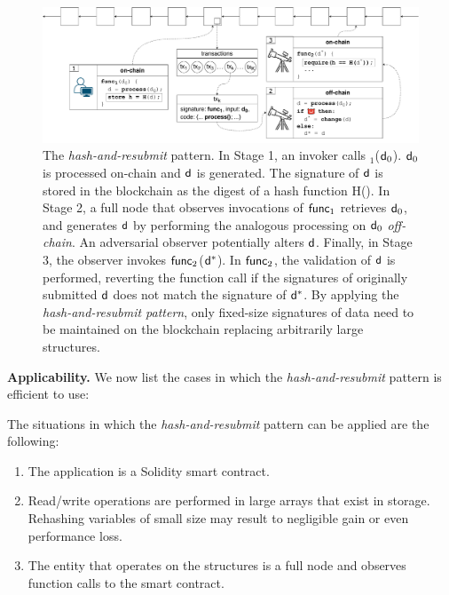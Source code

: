 \begin{figure}[h]
    \begin{center} \includegraphics[width=1\textwidth]{figures/har-pattern.pdf}
    \end{center}

    \caption{The \emph{hash-and-resubmit} pattern. In Stage 1, an invoker calls
        \proc$_1$($\mathsf{d}_0$). $\mathsf{d}_0$ is processed on-chain and $\mathsf{d}$ is
        generated. The signature of $\mathsf{d}$ is stored in the blockchain as the
        digest of a hash function \textsf{H}(). In Stage 2, a full node that
        observes invocations of $\textsf{func}_1$ retrieves $\mathsf{d}_0$, and generates
        $\mathsf{d}$ by performing the analogous processing on $\mathsf{d}_0$
        \emph{off-chain}. An adversarial observer potentially alters $\mathsf{d}$.
        Finally, in Stage 3, the observer invokes $\textsf{func}_2$($\mathsf{d}^*$). In
        $\textsf{func}_2$, the validation of $\mathsf{d}$ is performed, reverting the
        function call if the signatures of originally submitted $\mathsf{d}$ does
        not match the signature of $\mathsf{d}^*$. By applying the
        \emph{hash-and-resubmit pattern}, only fixed-size signatures of data
        need to be maintained on the blockchain replacing arbitrarily large
        structures.}

        \label{fig:har-pattern}
\end{figure}

\noindent
\textbf{Applicability.}
We now list the cases in which the \emph{hash-and-resubmit} pattern is
efficient to use:

The situations in which the \emph{hash-and-resubmit} pattern can be applied are
the following:
\begin{enumerate}
    \item The application is a Solidity smart contract.
    \item Read/write operations are performed in large arrays that exist in
        storage. Rehashing variables of small size may result to negligible
        gain or even performance loss.
    \item The entity that operates on the structures is a full node and
        observes function calls to the smart contract.
\end{enumerate}

